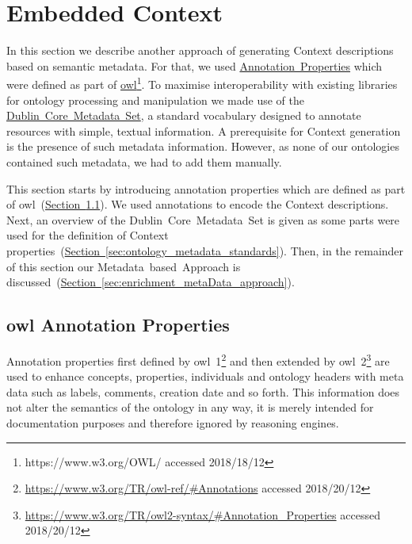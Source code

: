 
\section{Embedded Context}\label{sec:embedded_context}
In this section we describe another approach of generating Context descriptions based on semantic metadata.
For that, we used \hyperref[sec:OWL_annotation_properties]{Annotation~Properties} which were defined as part of \hyperref[sec:OWL_annotation_properties]{\gls{owl}\footnote{\url{https://www.w3.org/OWL/} accessed 2018/18/12}}. To maximise interoperability with existing libraries for ontology processing and manipulation we made use of the \hyperref[sec:dublin_core_metadata_vocabulary]{Dublin~Core~Metadata~Set}, a standard vocabulary designed to annotate resources with simple, textual information. A prerequisite for Context generation is the presence of such metadata information.
However, as none of our ontologies contained such metadata, we had to add them manually. 

This section starts by introducing annotation properties which are defined as part of \gls{owl}~(\hyperref[sec:OWL_annotation_properties]{Section~\ref*{sec:OWL_annotation_properties}}).
We used annotations to encode the Context descriptions. Next, an overview of the Dublin~Core~Metadata~Set is given as some parts were used for the definition of Context properties~(\hyperref[sec:ontology_metadata_standards]{Section~\ref*{sec:ontology_metadata_standards}}).
Then, in the remainder of this section our Metadata~based~Approach is discussed~(\hyperref[sec:enrichment_metaData_approach]{Section~\ref*{sec:enrichment_metaData_approach}}).

\subsection{\gls{owl} Annotation Properties}\label{sec:OWL_annotation_properties}
Annotation properties first defined by \gls{owl}~1\footnote{\url{https://www.w3.org/TR/owl-ref/\#Annotations} accessed 2018/20/12} and then extended by \gls{owl}~2\footnote{\url{https://www.w3.org/TR/owl2-syntax/\#Annotation_Properties} accessed 2018/20/12} are used to enhance concepts, properties, individuals and ontology headers with meta data such as labels, comments, creation date and so forth. This information does not alter the semantics of the ontology in any way, it is merely intended for documentation purposes and therefore ignored by reasoning engines. 

